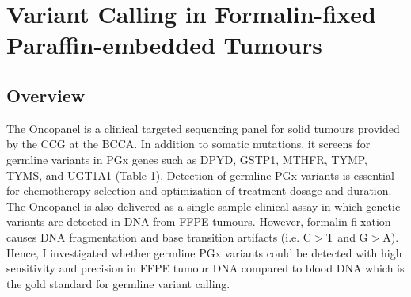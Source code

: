 
\chapter{Variant Calling in Formalin-fixed Paraffin-embedded Tumours}
\label{ch:VariantCallinginFormalin-fixedParaffin-embeddedTumours}

\section{Overview}
\label{sec:Overview}

The Oncopanel is a clinical targeted sequencing panel for solid tumours provided by the CCG at the BCCA. In addition to somatic mutations, it screens for germline variants in PGx genes such as DPYD, GSTP1, MTHFR, TYMP, TYMS, and UGT1A1 (Table 1). Detection of germline PGx variants is essential for chemotherapy selection and optimization of treatment dosage and duration. The Oncopanel is also delivered as a single sample clinical assay in which genetic variants are detected in DNA from FFPE tumours. However, formalin fixation causes DNA fragmentation and base transition artifacts (i.e. C$>$T and G$>$A). Hence, I investigated whether germline PGx variants could be detected with high sensitivity and precision in FFPE tumour DNA compared to blood DNA which is the gold standard for germline variant calling.
